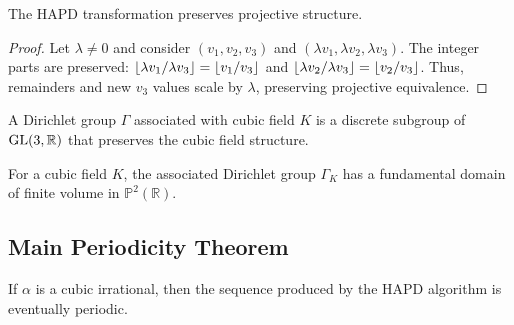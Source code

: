 \begin{proposition}\label{prop:projective_invariance}
The HAPD transformation preserves projective structure.
\end{proposition}

\begin{proof}
Let $\lambda \neq 0$ and consider $(v_1, v_2, v_3)$ and $(\lambda v_1, \lambda v_2, \lambda v_3)$. The integer parts are preserved: $\lfloor \lambda v_1/\lambda v_3 \rfloor = \lfloor v_1/v_3 \rfloor$ and $\lfloor \lambda v_2/\lambda v_3 \rfloor = \lfloor v_2/v_3 \rfloor$. Thus, remainders and new $v_3$ values scale by $\lambda$, preserving projective equivalence.
\end{proof}

\begin{definition}
A Dirichlet group $\Gamma$ associated with cubic field $K$ is a discrete subgroup of $\operatorname{GL}(3,\mathbb{R})$ that preserves the cubic field structure.
\end{definition}

\begin{theorem}\label{thm:finite_domain}
For a cubic field $K$, the associated Dirichlet group $\Gamma_K$ has a fundamental domain of finite volume in $\mathbb{P}^2(\mathbb{R})$.
\end{theorem}

\subsection{Main Periodicity Theorem}

\begin{theorem}\label{thm:cubic_periodic}
If $\alpha$ is a cubic irrational, then the sequence produced by the HAPD algorithm is eventually periodic.
\end{theorem}

